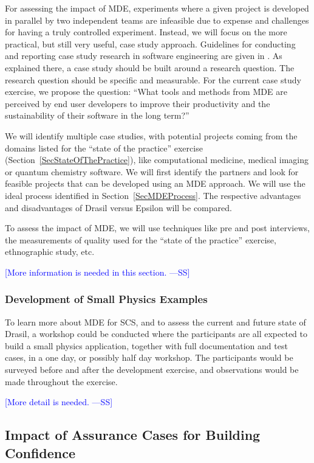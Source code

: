 \documentclass[12pt]{article}
\newcommand{\authornote}[3]{\textcolor{#1}{[#3 ---#2]}}
\newcommand{\authornote}[3]{}
\newcommand{\wss}[1]{\authornote{blue}{SS}{#1}} %
\begin{document}
For assessing the impact of MDE, experiments where a given project is developed
in parallel by two independent teams are infeasible due to expense and
challenges for having a truly controlled experiment.  Instead, we will focus on
the more practical, but still very useful, case study approach.  Guidelines for
conducting and reporting case study research in software engineering are given
in \citet{RunesonAndHost2009}.  As explained there, a case study should be built
around a research question.  The research question should be specific and
measurable.  For the current case study exercise, we propose the question:
``What tools and methods from MDE are perceived by end user developers to
improve their productivity and the sustainability of their software in the long
term?''

We will identify multiple case studies, with potential projects coming from the
domains listed for the ``state of the practice'' exercise
(Section~\ref{SecStateOfThePractice}), like computational medicine, medical
imaging or quantum chemistry software.  We will first identify the partners and
look for feasible projects that can be developed using an MDE approach.  We will
use the ideal process identified in Section~\ref{SecMDEProcess}.  The respective
advantages and disadvantages of Drasil versus Epsilon will be compared.

To assess the impact of MDE, we will use techniques like pre and post
interviews, the measurements of quality used for the ``state of the practice''
exercise, ethnographic study,  etc.

\wss{More information is needed in this section.}

\subsubsection {Development of Small Physics Examples} \label{SecSmallPhysExample}

To learn more about MDE for SCS, and to assess the current and future state of
Drasil, a workshop could be conducted where the participants are all expected to
build a small physics application, together with full documentation and test
cases, in a one day, or possibly half day workshop.  The participants would be
surveyed before and after the development exercise, and observations would be
made throughout the exercise.

\wss{More detail is needed.}

\subsection{Impact of Assurance Cases for Building
  Confidence} \label{SecAssuranceCase}
\end{document}
